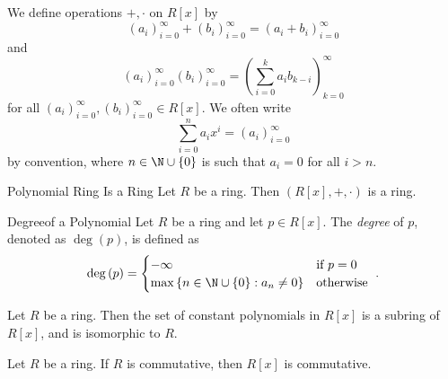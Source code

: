 \documentclass[pmath347]{subfiles}
\begin{document}
    \np We define operations $+, \cdot$ on $R\left[ x \right]$ by
    \begin{equation*}
        \left( a_{i} \right)^{\infty}_{i=0} + \left( b_{i} \right)^{\infty}_{i=0} = \left( a_{i}+b_{i} \right)^{\infty}_{i=0} 
    \end{equation*}
    and
    \begin{equation*}
        \left( a_{i} \right)^{\infty}_{i=0} \left( b_{i} \right)^{\infty}_{i=0} = \left( \sum^{k}_{i=0} a_ib_{k-i} \right)^{\infty}_{k=0} 
    \end{equation*}
    for all $\left( a_{i} \right)^{\infty}_{i=0} , \left( b_{i} \right)^{\infty}_{i=0} \in R\left[ x \right]$. We often write
    \begin{equation*}
        \sum^{n}_{i=0} a_ix^i = \left( a_{i} \right)^{\infty}_{i=0} 
    \end{equation*}
    by convention, where $n\in\N\cup\left\lbrace 0 \right\rbrace$ is such that $a_i=0$ for all $i>n$.

    \begin{prop}{Polynomial Ring Is a Ring}
        Let $R$ be a ring. Then $\left( R\left[ x \right] , +, \cdot \right)$ is a ring.
    \end{prop}

    \begin{definition}{Degree}{of a Polynomial}
        Let $R$ be a ring and let $p\in R\left[ x \right]$. The \emph{degree} of $p$, denoted as $\deg\left( p \right)$, is defined as
        \begin{equation*}
            \deg\left( p \right) = 
            \begin{cases} 
                -\infty & \text{if }p=0 \\
                \max\left\lbrace n\in\N\cup\left\lbrace 0 \right\rbrace : a_n\neq 0 \right\rbrace & \text{otherwise } \\
            \end{cases}.
        \end{equation*}
    \end{definition}

    \clearpage
    \begin{prop}{}
        Let $R$ be a ring. Then the set of constant polynomials in $R\left[ x \right]$ is a subring of $R\left[ x \right]$, and is isomorphic to $R$.
    \end{prop}

    \begin{prop}{}
        Let $R$ be a ring. If $R$ is commutative, then $R\left[ x \right]$ is commutative.
    \end{prop}
\end{document}
